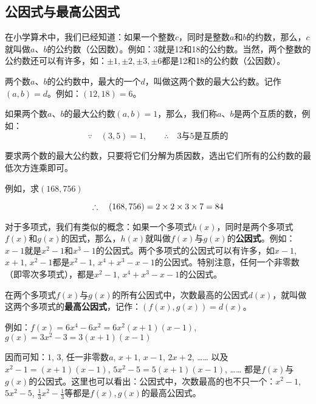 \subsection{公因式与最高公因式}
在小学算术中，我们已经知道：如果一个整数$c$，同时是整数$a$和$b$的约数，那么，$c$就叫做$a$、$b$的公约数（公因数）。例如：3就是12和18的公约数。当然，两个整数的公约数还可以有许多，如：$\pm 1,\pm 2,\pm 3,\pm 6$都是12和18的公约数（公因数）。

两个数$a$、$b$的公约数中，最大的一个$d$，叫做这两个数的最大公约数。记作$(a,b)=d$。例如：$(12, 18)=6$。

如果两个数$a$、$b$的最大公约数$(a,b)=1$，那么，我们称$a$、$b$是两个互质的数，例如：
\[\because\quad (3,5)=1,\qquad \therefore\quad \text{3与5是互质的}\]

要求两个数的最大公约数，只要将它们分解为质因数，选出它们所有的公约数的最低次方连乘即可。

例如，求$(168,756)$
\begin{center}
\end{center}
\[\therefore \quad (168, 756)=2\times 2\times 3\times 7=84\]

对于多项式，我们有类似的概念：如果一个多项式$h(x)$，同时是两个多项式$f(x)$和$g(x)$的因式，那么，$h(x)$就叫做$f(x)$与$g(x)$的\textbf{公因式}。例如：$x-1$就是$x^2-1$和$x^3-1$的公因式。两个多项式的公因式可以有许多，如$x-1$, $x+1$, $x^2-1$都是$x^2-1$, $x^4+x^3-x-1$的公因式。特别注意，任何一个非零数（即零次多项式），都是$x^2-1$, $x^4+x^3-x-1$的公因式。

在两个多项式$f(x)$与$g(x)$的所有公因式中，次数最高的公因式$d(x)$，就叫做这两个多项式的\textbf{最高公因式}，记作：$(f(x),g(x))=d(x)$。

例如：$f(x)=6x^4-6x^2=6x^2(x+1)(x-1)$, 
$g (x) =3x^2-3=3 (x+1) (x-1)$

因而可知：$1$, $3$, 任一非零数$a$, $x+1$, $x-1$, $2x+2$, …… 以及$x^2-1=(x+1)(x-1)$, $5x^2-5=5(x+1)(x-1)$, …… 都是$f(x)$与$g(x)$的公因式。这里也可以看出：公因式中，次数最高的也不只一个：$x^2-1$,$5x^2-5$, $\frac{1}{3}x^2-\frac{1}{3}$等都是$f(x),g(x)$的最高公因式。


